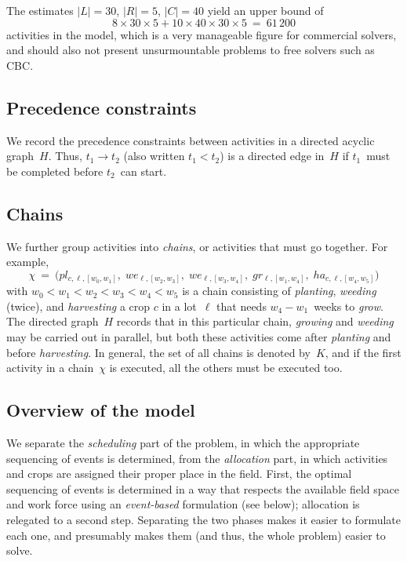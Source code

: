 \documentclass[11pt,reqno]{amsart}
\newcommand{\lra}{\longrightarrow}
\numberwithin{equation}{section}
\begin{document}
The estimates $|L|=30$, $|R|=5$, $|C|=40$ yield an upper bound of
\[
    8 \times 30 \times 5 + 10 \times 40 \times 30 \times 5
    \ = \
    61\,200
\]
activities in the model, which is a very manageable figure for commercial solvers, and
should also not present unsurmountable problems to free solvers such as CBC.

\subsection{Precedence constraints}

We record the precedence constraints between  activities in a directed acyclic
graph~$H$. Thus, $t_1\lra t_2$ (also written $t_1<t_2$) is a directed edge
in~$H$ if $t_1$~must be completed before $t_2$~can start. 

\subsection{Chains}
We further group activities into \emph{chains}, or activities that must go
together. For example,
\[
   \chi
   \ = \
   \big(pl_{c,\ell,[w_0,w_1]}, \;
    we_{\ell,[w_2,w_3]},\;
    we_{\ell,[w_3,w_4]},\;
    gr_{\ell,[w_1,w_4]},\;
    ha_{c,\ell,[w_4,w_5]}\big)
\]
with $w_0<w_1<w_2<w_3<w_4<w_5$ is a chain consisting of \emph{planting}, \emph{weeding}
(twice), and \emph{harvesting} a crop $c$ in a lot~$\ell$ that needs $w_4-w_1$~weeks to
\emph{grow}. The directed graph~$H$ records that in this particular chain, \emph{growing}
and \emph{weeding} may be carried out in parallel, but both these activities come after
\emph{planting} and before \emph{harvesting}. In general, the set of all chains is denoted
by~$K$, and if the first activity in a chain~$\chi$ is executed, all the others must be
executed too. 

\subsection{Overview of the model}


We separate the \emph{scheduling} part of the problem, in which the
appropriate sequencing of events is determined, from the
\emph{allocation} part, in which activities and crops are assigned
their proper place in the field. First, the optimal sequencing of
events is determined in a way that respects the available field space
and work force using an \emph{event-based} formulation (see below);
allocation is relegated to a second step. Separating the two phases
makes it easier to formulate each one, and presumably makes them (and
thus, the whole problem) easier to solve.
\end{document}
